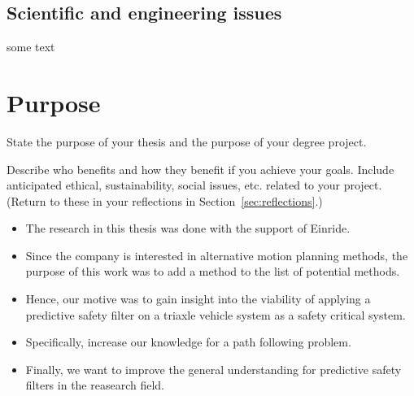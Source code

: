 \documentclass[english]{kththesis}
\begin{document}
\subsection{Scientific and engineering issues}
some text

\section{Purpose}
State the purpose  of your thesis and the purpose of your degree project.

Describe who benefits and how they benefit if you achieve your goals. Include anticipated ethical, sustainability, social issues, etc. related to your project. (Return to these in your reflections in Section~\ref{sec:reflections}.)


\begin{itemize}
    \item The research in this thesis was done with the support of Einride.
    \item Since the company is interested in alternative motion planning
        methods, the purpose of this work was to add a method to the list of
        potential methods.
    \item Hence, our motive was to gain insight into the viability of applying
        a predictive safety filter on a triaxle vehicle system as a safety
        critical system.
    \item Specifically, increase our knowledge for a path following problem.
    \item Finally, we want to improve the general understanding for predictive
        safety filters in the reasearch field.
\end{itemize}
\end{document}

